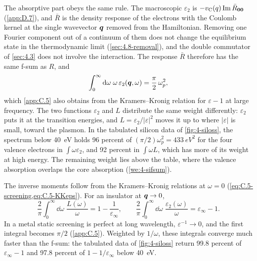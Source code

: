 The absorptive part obeys the same rule. The macroscopic $\varepsilon_2$ is $-v_{\mathrm{C}}(q)\operatorname{Im}\bar R_{\bm{0}\bm{0}}$ (\cref{app:D.7}), and $\bar R$ is the density response of the electrons with the Coulomb kernel at the single wavevector $\bm{q}$ removed from the Hamiltonian. Removing one Fourier component out of a continuum of them does not change the equilibrium state in the thermodynamic limit (\cref{sec:4.8-removal}), and the double commutator of \cref{sec:4.3} does not involve the interaction. The response $\bar R$ therefore has the same f-sum as $R$, and
\begin{equation}
  \int_0^\infty\mathrm{d}\omega\;\omega\,\varepsilon_2(\bm{q},\omega) = \frac{\pi}{2}\,\omega_p^2 ,
  \label{eq:4.4-fsumeps}
\end{equation}
which \cref{app:C.5} also obtains from the Kramers--Kronig relation for $\varepsilon - 1$ at large frequency. The two functions $\varepsilon_2$ and $L$ distribute the same weight differently: $\varepsilon_2$ puts it at the transition energies, and $L = \varepsilon_2/|\varepsilon|^2$ moves it up to where $|\varepsilon|$ is small, toward the plasmon. In the tabulated silicon data of \cref{fig:4-siloss}, the spectrum below \SI{40}{eV} holds 96 percent of $(\pi/2)\omega_p^2 = \SI{433}{eV^2}$ for the four valence electrons in $\int\omega\varepsilon_2$, and 92 percent in $\int\omega L$, which has more of its weight at high energy. The remaining weight lies above the table, where the valence absorption overlaps the core absorption (\cref{we:4-sifsum}).

The inverse moments follow from the Kramers--Kronig relations at $\omega = 0$ (\cref{eq:C.5-screening,eq:C.5-KKeps}). For an insulator at $\bm{q} \to 0$,
\begin{equation}
  \frac{2}{\pi}\int_0^\infty\dd\omega\;\frac{L(\omega)}{\omega} = 1 - \frac{1}{\varepsilon_\infty}, \qquad
  \frac{2}{\pi}\int_0^\infty\dd\omega\;\frac{\varepsilon_2(\omega)}{\omega} = \varepsilon_\infty - 1 .
  \label{eq:4.4-inverse}
\end{equation}
In a metal static screening is perfect at long wavelength, $\varepsilon^{-1} \to 0$, and the first integral becomes $\pi/2$ (\cref{app:C.5}). Weighted by $1/\omega$, these integrals converge much faster than the f-sum: the tabulated data of \cref{fig:4-siloss} return 99.8 percent of $\varepsilon_\infty - 1$ and 97.8 percent of $1 - 1/\varepsilon_\infty$ below \SI{40}{eV}.

